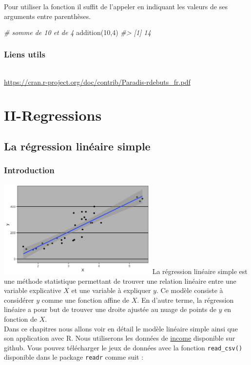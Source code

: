 \documentclass[
]{book}
\newenvironment{Shaded}{\begin{snugshade}}{\end{snugshade}}
\newcommand{\CommentTok}[1]{\textcolor[rgb]{0.56,0.35,0.01}{\textit{#1}}}
\newcommand{\DecValTok}[1]{\textcolor[rgb]{0.00,0.00,0.81}{#1}}
\newcommand{\FunctionTok}[1]{\textcolor[rgb]{0.00,0.00,0.00}{#1}}
\newcommand{\NormalTok}[1]{#1}
\begin{document}
Pour utiliser la fonction il suffit de l'appeler en indiquant les valeurs de ses arguments entre parenthèses.

\begin{Shaded}
\begin{Highlighting}[]
\CommentTok{\# somme de 10 et de 4}
\FunctionTok{addition}\NormalTok{(}\DecValTok{10}\NormalTok{,}\DecValTok{4}\NormalTok{)}
\CommentTok{\#\textgreater{} [1] 14}
\end{Highlighting}
\end{Shaded}

\hypertarget{liens-utils}{%
\section*{Liens utils}\label{liens-utils}}

\citet{base}\strut \\
\url{https://cran.r-project.org/doc/contrib/Paradis-rdebuts_fr.pdf}

\hypertarget{part-ii-regressions}{%
\part{II-Regressions}\label{part-ii-regressions}}

\hypertarget{simple-lm}{%
\chapter{La régression linéaire simple}\label{simple-lm}}

\hypertarget{introduction}{%
\section{Introduction}\label{introduction}}

\includegraphics[width=3.125in,height=\textheight]{Pictures/lm.png} La régression linéaire
simple est une méthode statistique permettant de trouver une relation
linéaire entre une variable explicative \(X\) et une variable à expliquer
\(y\). Ce modèle consiste à considérer \(y\) comme une fonction affine de
\(X\). En d'autre terme, la régression linéaire a pour but de trouver une
droite ajustée au nuage de points de \(y\) en fonction de \(X\).\\
Dans ce chapitres nous allons voir en détail le modèle linéaire simple
ainsi que son application avec R. Nous utiliserons les données de
\href{https://github.com/AODiakite/r4econometrics/blob/master/Data/income.data.csv}{income}
disponible sur github. Vous pouvez télécharger le jeux de données avec
la fonction \texttt{read\_csv()} disponible dans le package \texttt{readr} comme suit :
\end{document}

